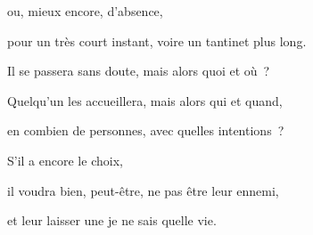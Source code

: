 {ou, mieux encore, d'absence,

pour un très court instant, voire un tantinet plus long.

\bigskip

Il se passera sans doute, mais alors quoi et où~?

Quelqu'un les accueillera, mais alors qui et quand,

en combien de personnes, avec quelles intentions~?

S'il a encore le choix,

il voudra bien, peut-être, ne pas être leur ennemi,

et leur laisser une je ne sais quelle vie.
\setlength{\parskip}{6pt}}


